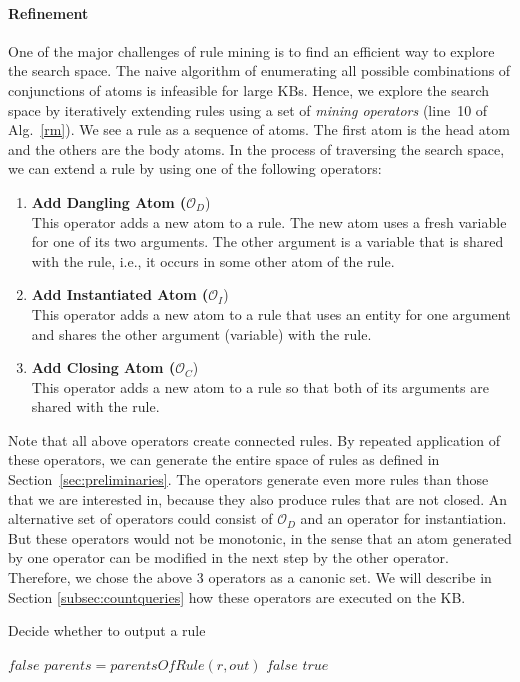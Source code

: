 \paragraph{Refinement}\label{subsubsec:refinement}
One of the major challenges of rule mining is to find an efficient way to explore the search space. 
The naive algorithm of enumerating all possible combinations of conjunctions of atoms is infeasible for large KBs.
Hence, we explore the search space by iteratively extending rules using a set of \emph{mining operators} (line~10 of Alg.~\ref{rm}).
We see a rule as a sequence of atoms. The first atom is the head atom and the others are the body atoms. 
In the process of traversing the search space, we can extend a rule by using one of the following operators:
\begin{enumerate}
\item \textbf{Add Dangling Atom ($\mathcal{O}_D$})\\
This operator adds a new atom to a rule. The new atom uses a fresh variable for one of its two arguments. The other argument is a variable
that is shared with the rule, i.e., it occurs in some other atom of the rule.
\item \textbf{Add Instantiated Atom ($\mathcal{O}_I$})\\
This operator adds a new atom to a rule that uses an entity for one argument and shares the other argument (variable) with the rule.
\item \textbf{Add Closing Atom ($\mathcal{O}_C$})\\
This operator adds a new atom to a rule so that both of its arguments are shared with the rule.
\end{enumerate}
Note that all above operators create connected rules.
By repeated application of these operators, we can generate the entire space of rules as defined in Section~\ref{sec:preliminaries}.
The operators generate even more rules than those that we are interested in, because they also produce rules that are not closed.
An alternative set of operators could consist of $\mathcal{O}_D$ and an operator for instantiation.
But these operators would not be monotonic, in the sense that an atom generated by one operator can be modified in the next step by the other operator.
Therefore, we chose the above 3 operators as a canonic set. We will describe in Section \ref{subsec:countqueries} how these operators are executed on the KB.

\begin{algorithm}
\caption{Decide whether to output a rule}
\label{pfo}
\begin{algorithmic}[1]
      \State \Return $false$
    \EndIf 
    \State $parents = parentsOfRule(r, out)$
	\State \Return $false$
      \EndIf
    \EndFor
    \State \Return $true$
\EndFunction
\end{algorithmic}
\end{algorithm}

